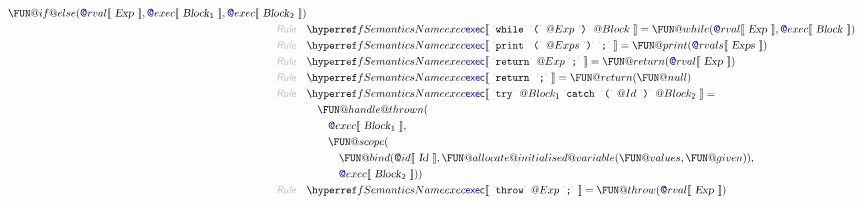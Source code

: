 \begin{align*}
      \FUN@if@else
        (  \SEM@rval \LEFTPHRASE \
                        \VAR{Exp} \
                      \RIGHTPHRASE , 
               \SEM@exec \LEFTPHRASE \
                        \VAR{Block}\SUB{1} \
                      \RIGHTPHRASE , 
               \SEM@exec \LEFTPHRASE \
                        \VAR{Block}\SUB{2} \
                      \RIGHTPHRASE  )
\\
  \KEY{Rule} \quad
    & \SEMREF{exec} \LEFTPHRASE \
                            \LEX{while} \ \LEX{{(}} \ \VAR@Exp \ \LEX{{)}} \ \VAR@Block \
                          \RIGHTPHRASE  = 
      \FUN@while
        (  \SEM@rval \LEFTPHRASE \
                        \VAR{Exp} \
                      \RIGHTPHRASE , 
               \SEM@exec \LEFTPHRASE \
                        \VAR{Block} \
                      \RIGHTPHRASE  )
\\
  \KEY{Rule} \quad
    & \SEMREF{exec} \LEFTPHRASE \
                            \LEX{print} \ \LEX{{(}} \ \VAR@Exps \ \LEX{{)}} \ \LEX{{;}} \
                          \RIGHTPHRASE  = 
      \FUN@print
        (  \SEM@rvals \LEFTPHRASE \
                        \VAR{Exps} \
                      \RIGHTPHRASE  )
\\
  \KEY{Rule} \quad
    & \SEMREF{exec} \LEFTPHRASE \
                            \LEX{return} \ \VAR@Exp \ \LEX{{;}} \
                          \RIGHTPHRASE  = 
      \FUN@return
        (  \SEM@rval \LEFTPHRASE \
                        \VAR{Exp} \
                      \RIGHTPHRASE  )
\\
  \KEY{Rule} \quad
    & \SEMREF{exec} \LEFTPHRASE \
                            \LEX{return} \ \LEX{{;}} \
                          \RIGHTPHRASE  = 
      \FUN@return
        (  \FUN@null )
\\
  \KEY{Rule} \quad
    & \SEMREF{exec} \LEFTPHRASE \
                            \LEX{try} \ \VAR@Block\SUB{1} \ \LEX{catch} \ \LEX{{(}} \ \VAR@Id \ \LEX{{)}} \ \VAR@Block\SUB{2} \
                          \RIGHTPHRASE  = \\&\quad
      \FUN@handle@thrown
        ( \\&\quad\quad \SEM@exec \LEFTPHRASE \
                        \VAR{Block}\SUB{1} \
                      \RIGHTPHRASE , \\&\quad\quad
               \FUN@scope
                ( \\&\quad\quad\quad \FUN@bind
                        (  \SEM@id \LEFTPHRASE \
                                        \VAR{Id} \
                                      \RIGHTPHRASE , 
                               \FUN@allocate@initialised@variable
                                (  \FUN@values, 
                                       \FUN@given ) ), \\&\quad\quad\quad
                       \SEM@exec \LEFTPHRASE \
                                \VAR{Block}\SUB{2} \
                              \RIGHTPHRASE  ) )
\\
  \KEY{Rule} \quad
    & \SEMREF{exec} \LEFTPHRASE \
                            \LEX{throw} \ \VAR@Exp \ \LEX{{;}} \
                          \RIGHTPHRASE  = 
      \FUN@throw
        (  \SEM@rval \LEFTPHRASE \
                        \VAR{Exp} \
                      \RIGHTPHRASE  )
\end{align*}


